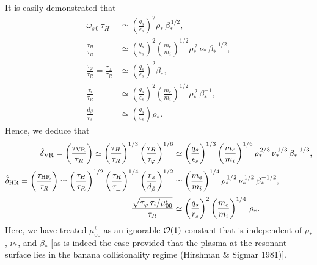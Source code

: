 \documentclass[notitlepage,12pt]{article}
\begin{document}
It is easily demonstrated that
\begin{align}
\omega_{s\,0}\,\tau_H&\simeq \left(\frac{q_s}{\epsilon_s}\right)^2\rho_\ast\,\beta_\ast^{\,1/2},\\[0.5ex]
\frac{\tau_H}{\tau_R}&\simeq \left(\frac{q_s}{\epsilon_s}\right)^2\left(\frac{m_e}{m_i}\right)^{1/2}\rho_\ast^{\,2}\,\nu_\ast\,\beta_\ast^{-1/2},\\[0.5ex]
\frac{\tau_\varphi}{\tau_R} = \frac{\tau_\perp}{\tau_R} &\simeq \left(\frac{q_s}{\epsilon_s}\right)^2\beta_\ast,\\[0.5ex]
\frac{\tau_i}{\tau_R} &\simeq  \left(\frac{q_s}{\epsilon_s}\right)^2\left(\frac{m_e}{m_i}\right)^{1/2}\rho_\ast^{\,2}\,\beta_\ast^{-1},\\[0.5ex]
\frac{d_\beta}{r_s} &\simeq \left(\frac{q_s}{\epsilon_s}\right)\rho_\ast.
\end{align} 
Hence, we deduce that 
\begin{align}
\hat{\delta}_{\rm VR} = \left(\frac{\tau_{\rm VR}}{\tau_R}\right) \simeq\left(\frac{\tau_H}{\tau_R}\right)^{1/3}\left(\frac{\tau_R}{\tau_\varphi}\right)^{1/6}&\simeq \left(\frac{q_s}{\epsilon_s}\right)^{1/3}\left(\frac{m_e}{m_i}\right)^{1/6}\rho_\ast^{\,2/3}\,\nu_\ast^{\,1/3}\,\beta_\ast^{-1/3},\\[0.5ex]
\hat{\delta}_{\rm HR} = \left(\frac{\tau_{\rm HR}}{\tau_R}\right) \simeq \left(\frac{\tau_H}{\tau_R}\right)^{1/2}\left(\frac{\tau_R}{\tau_\perp}\right)^{1/4}\left(\frac{r_s}{d_\beta}\right)^{1/2}&\simeq \left(\frac{m_e}{m_i}\right)^{1/4}\rho_\ast^{\,1/2}\,\nu_\ast^{\,1/2}\,\beta_\ast^{-1/2},\\[0.5ex]
\frac{\sqrt{\tau_\varphi\, \tau_i/\mu_{00}^i}}{\tau_R}&\simeq \left(\frac{q_s}{r_s}\right)^2\left(\frac{m_e}{m_i}\right)^{1/4}\,\rho_\ast.
\end{align}
Here, we have treated $\mu_{00}^i$ as an ignorable ${\cal O}(1)$ constant that is independent of $\rho_\ast$, $\nu_\ast$, and
$\beta_\ast$ [as is indeed the case provided that the plasma at the resonant surface lies in the banana collisionality regime (Hirshman \& Sigmar 1981)]. 
\end{document}
